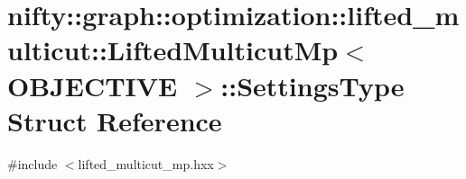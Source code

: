 \hypertarget{structnifty_1_1graph_1_1optimization_1_1lifted__multicut_1_1LiftedMulticutMp_1_1SettingsType}{}\section{nifty\+:\+:graph\+:\+:optimization\+:\+:lifted\+\_\+multicut\+:\+:Lifted\+Multicut\+Mp$<$ O\+B\+J\+E\+C\+T\+I\+V\+E $>$\+:\+:Settings\+Type Struct Reference}
\label{structnifty_1_1graph_1_1optimization_1_1lifted__multicut_1_1LiftedMulticutMp_1_1SettingsType}


{\ttfamily \#include $<$lifted\+\_\+multicut\+\_\+mp.\+hxx$>$}

